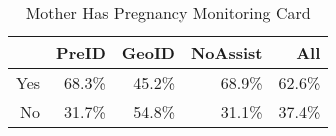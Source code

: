 
\begin{table}[ht]
\centering
\begin{tabular}{rrrrr}
  \hline
 & PreID & GeoID & NoAssist & All \\ 
  \hline
Yes & 68.3\% & 45.2\% & 68.9\% & 62.6\% \\ 
  No & 31.7\% & 54.8\% & 31.1\% & 37.4\% \\ 
   \hline
\end{tabular}
\caption{Mother Has Pregnancy Monitoring Card} 
\end{table}

